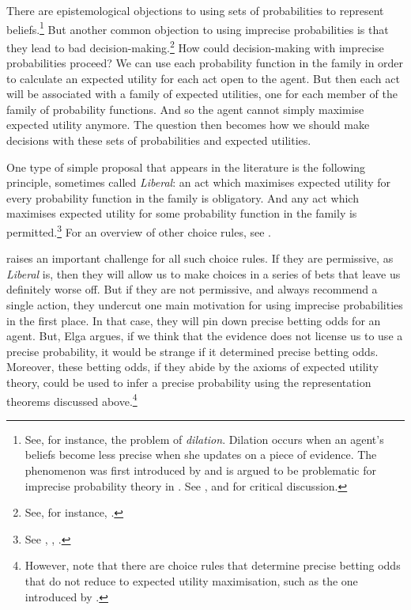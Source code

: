 There are epistemological objections to using sets of probabilities to represent beliefs.\footnote{See, for instance, the problem of {\em dilation}. Dilation occurs when an agent's beliefs become less precise when she updates on a piece of evidence. The phenomenon was first introduced by \citet{SeidenfeldWasserman1993} and is argued to be problematic for imprecise probability theory in \citet{White2010}. See \citet{Joyce2011}, \citet{BradleySteele2014b} and \citet{PedersenWheeler2014} for critical discussion.} But another common objection to using imprecise probabilities is that they lead to bad decision-making.\footnote{See, for instance, \citet{Williamson2010}.} How could decision-making with imprecise probabilities proceed? We can use each probability function in the family in order to calculate an expected utility for each act open to the agent. But then each act will be associated with a family of expected utilities, one for each member of the family of probability functions. And so the agent cannot simply maximise expected utility anymore. The question then becomes how we should make decisions with these sets of probabilities and expected utilities.

One type of simple proposal that appears in the literature is the following principle, sometimes called {\em Liberal}: an act which maximises expected utility for every probability function in the family is obligatory. And any act which maximises expected utility for some probability function in the family is permitted.\footnote{See \citet{White2010}, \citet{Williams2014}, \citet{Moss2015}.} For an overview of other choice rules, see \citet{Troffaes2007}.

\citet{Elga2010} raises an important challenge for all such choice rules. If they are permissive, as {\em Liberal} is, then they will allow us to make choices in a series of bets that leave us definitely worse off. But if they are not permissive, and always recommend a single action, they undercut one main motivation for using imprecise probabilities in the first place. In that case, they will pin down precise betting odds for an agent. But, Elga argues, if we think that the evidence does not license us to use a precise probability, it would be strange if it determined precise betting odds. Moreover, these betting odds, if they abide by the axioms of expected utility theory, could be used to infer a precise probability using the representation theorems discussed above.\footnote{However, note that there are choice rules that determine precise betting odds that do not reduce to expected utility maximisation, such as the one introduced by \citet{SahlinWeirich2014}.}

